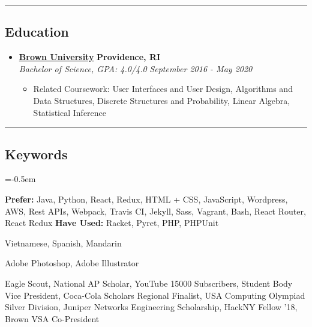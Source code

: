 \documentclass[10pt,letterpaper]{article}
\begin{document}
\hrule
\vspace{-1.0em}
\subsection*{Education}
  \begin{itemize}
    \parskip=-0.5em

    \item[]
    {\href{https://www.brown.edu/}{\textbf{Brown University}} \hfill
      \textbf{Providence, RI}}
    \\
    {\emph{Bachelor of Science, GPA: 4.0/4.0} \hfill
      \emph{September 2016 - May 2020}}

    \begin{itemize}[label=\textbullet]
      \item Related Coursework: User Interfaces and User Design, Algorithms and Data Structures, Discrete Structures and Probability, Linear Algebra, Statistical Inference
    \end{itemize}
  \end{itemize}

\hrule
\vspace{-1.0em}
\subsection*{Keywords}
\begin{description}[labelindent=\parindent]
  \parskip=-0.5em
\item[Languages + Frameworks + Libraries:] \textbf{Prefer:} Java, Python, React, Redux, HTML + CSS, JavaScript, Wordpress, AWS, Rest APIs, Webpack, Travis CI, Jekyll, Sass, Vagrant, Bash, React Router, React Redux \textbf{Have Used:} Racket, Pyret, PHP, PHPUnit
  \item[Human Languages:] Vietnamese, Spanish, Mandarin
  \item[Design:] Adobe Photoshop, Adobe Illustrator
  \item[Accomplishments:] Eagle Scout, National AP Scholar, YouTube 15000 Subscribers, Student Body Vice President, Coca-Cola Scholars Regional Finalist, USA Computing Olympiad Silver Division, Juniper Networks Engineering Scholarship, HackNY Fellow '18, Brown VSA Co-President
\end{description}
\end{document}
